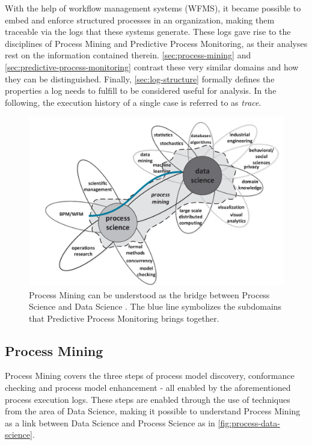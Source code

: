 With the help of workflow management systems (WFMS), it became possible to embed and enforce structured processes in an organization, making them traceable via the logs that these systems generate. These logs gave rise to the disciplines of Process Mining and Predictive Process Monitoring, as their analyses rest on the information contained therein. \autoref{sec:process-mining} and \autoref{sec:predictive-process-monitoring} contrast these very similar domains and how they can be distinguished. Finally, \autoref{sec:log-structure} formally defines the properties a log needs to fulfill to be considered useful for analysis.
In the following, the execution history of a single case is referred to as \textit{trace}.

\begin{figure}
    \centering
    \includegraphics[width=.8\textwidth]{gfx/process-data-science.png}
    \caption{Process Mining can be understood as the bridge between Process Science and Data Science \cite[p.18]{Aalst2016}. The blue line symbolizes the subdomains that Predictive Process Monitoring brings together.}
    \label{fig:process-data-science}
\end{figure}

\subsection{Process Mining}\label{sec:process-mining}
Process Mining covers the three steps of process model discovery, conformance checking and process model enhancement \cite{Aalst2016} -  all enabled by the aforementioned process execution logs. These steps are enabled through the use of techniques from the area of Data Science, making it possible to understand Process Mining as a link between Data Science and Process Science as in \autoref{fig:process-data-science}. 

